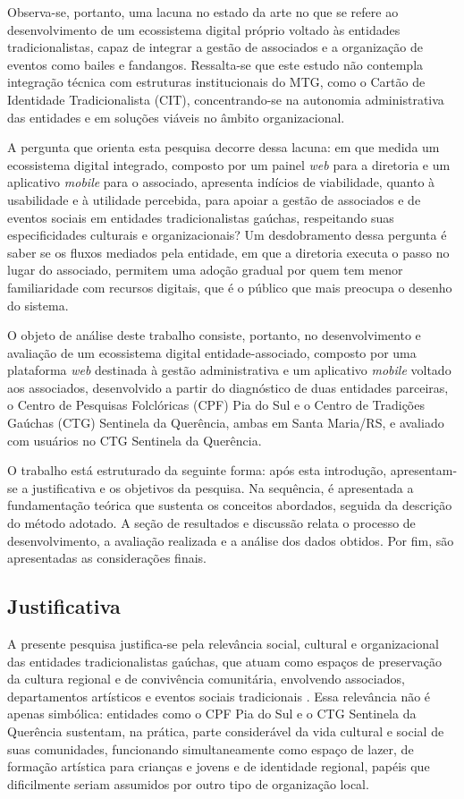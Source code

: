\documentclass[12pt,a4paper]{article}
\begin{document}
Observa-se, portanto, uma lacuna no estado da arte no que se refere ao desenvolvimento de um
ecossistema digital próprio voltado às entidades tradicionalistas, capaz de integrar a gestão de
associados e a organização de eventos como bailes e fandangos. Ressalta-se que este estudo não
contempla integração técnica com estruturas institucionais do MTG, como o Cartão de Identidade
Tradicionalista (CIT), concentrando-se na autonomia administrativa das entidades e em soluções
viáveis no âmbito organizacional.

A pergunta que orienta esta pesquisa decorre dessa lacuna: em que medida um ecossistema digital
integrado, composto por um painel \textit{web} para a diretoria e um aplicativo \textit{mobile} para o
associado, apresenta indícios de viabilidade, quanto à usabilidade e à utilidade percebida, para apoiar
a gestão de associados e de eventos sociais em entidades tradicionalistas gaúchas, respeitando suas
especificidades culturais e organizacionais? Um desdobramento dessa pergunta é saber se os fluxos
mediados pela entidade, em que a diretoria executa o passo no lugar do associado, permitem uma adoção
gradual por quem tem menor familiaridade com recursos digitais, que é o público que mais preocupa o
desenho do sistema.

O objeto de análise deste trabalho consiste, portanto, no desenvolvimento e avaliação de um
ecossistema digital entidade-associado, composto por uma plataforma \textit{web} destinada à gestão
administrativa e um aplicativo \textit{mobile} voltado aos associados, desenvolvido a partir do
diagnóstico de duas entidades parceiras, o Centro de Pesquisas Folclóricas (CPF) Pia do Sul e o Centro
de Tradições Gaúchas (CTG) Sentinela da Querência, ambas em Santa Maria/RS, e avaliado com usuários
no CTG Sentinela da Querência.

O trabalho está estruturado da seguinte forma: após esta introdução, apresentam-se a justificativa e
os objetivos da pesquisa. Na sequência, é apresentada a fundamentação teórica que sustenta os
conceitos abordados, seguida da descrição do método adotado. A seção de resultados e discussão
relata o processo de desenvolvimento, a avaliação realizada e a análise dos dados obtidos.
Por fim, são apresentadas as considerações finais.

\subsection{Justificativa}

A presente pesquisa justifica-se pela relevância social, cultural e organizacional das entidades
tradicionalistas gaúchas, que atuam como espaços de preservação da cultura regional e de
convivência comunitária, envolvendo associados, departamentos artísticos e eventos sociais
tradicionais \parencite{vargas2019,tatsch2024}. Essa relevância não é apenas simbólica: entidades
como o CPF Pia do Sul e o CTG Sentinela da Querência sustentam, na prática, parte considerável da
vida cultural e social de suas comunidades, funcionando simultaneamente como espaço de lazer, de
formação artística para crianças e jovens e de identidade regional, papéis que dificilmente seriam
assumidos por outro tipo de organização local.
\end{document}
